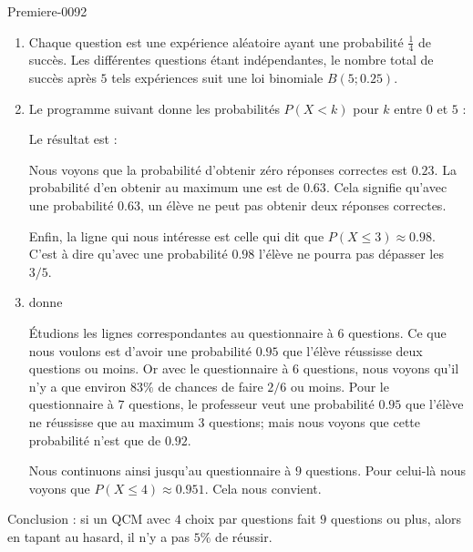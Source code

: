 
\begin{corrige}{Premiere-0092}

    \begin{enumerate}
        \item
            Chaque question est une expérience aléatoire ayant une probabilité \( \frac{1}{ 4 }\) de succès. Les différentes questions étant indépendantes, le nombre total de succès après \( 5\) tels expériences suit une loi binomiale \( B(5;0.25)\).
        \item
            Le programme suivant donne les probabilités \( P(X<k)\) pour \( k\) entre \( 0\) et \( 5\) :

Le résultat est :

            Nous voyons que la probabilité d'obtenir zéro réponses correctes est \( 0.23\). La probabilité d'en obtenir au maximum une est de \( 0.63\). Cela signifie qu'avec une probabilité \( 0.63\), un élève ne peut pas obtenir deux réponses correctes.

            Enfin, la ligne qui nous intéresse est celle qui dit que \( P(X\leq 3)\approx 0.98\). C'est à dire qu'avec une probabilité \( 0.98\) l'élève ne pourra pas dépasser les \( 3/5\).

        \item

donne


        Étudions les lignes correspondantes au questionnaire à \( 6\) questions. Ce que nous voulons est d'avoir une probabilité \( 0.95\) que l'élève réussisse deux questions ou moins. Or avec le questionnaire à \( 6\) questions, nous voyons qu'il n'y a que environ \( 83\%\) de chances de faire \( 2/6\) ou moins. Pour le questionnaire à \( 7\) questions, le professeur veut une probabilité \( 0.95\) que l'élève ne réussisse que au maximum \( 3\) questions; mais nous voyons que cette probabilité n'est que de $0.92$.

        Nous continuons ainsi jusqu'au questionnaire à \( 9\) questions. Pour celui-là nous voyons que \( P(X\leq 4)\approx 0.951\). Cela nous convient.

    \end{enumerate}
    Conclusion : si un QCM avec \( 4\) choix par questions fait \( 9\) questions ou plus, alors en tapant au hasard, il n'y a pas \( 5\%\) de réussir.

\end{corrige}
